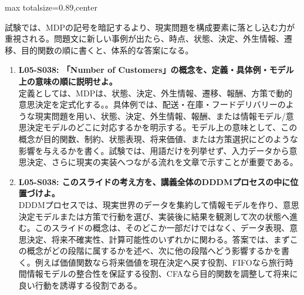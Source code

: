 \begin{minipage}[t]{0.58\textwidth}
\begin{adjustbox}{max totalsize={\textwidth}{0.89\textheight},center}
\begin{minipage}{\textwidth}
試験では、MDPの記号を暗記するより、現実問題を構成要素に落とし込む力が重視される。問題文に新しい事例が出たら、時点、状態、決定、外生情報、遷移、目的関数の順に書くと、体系的な答案になる。\par{}\begin{enumerate}\item \textbf{L05-S038: 「Number of Customers」の概念を、定義・具体例・モデル上の意味の順に説明せよ。}\\定義としては、MDPは、状態、決定、外生情報、遷移、報酬、方策で動的意思決定を定式化する。。具体例では、配送・在庫・フードデリバリーのような現実問題を用い、状態、決定、外生情報、報酬、または情報モデル/意思決定モデルのどこに対応するかを明示する。モデル上の意味として、この概念が目的関数、制約、状態表現、将来価値、または方策選択にどのような影響を与えるかを書く。試験では、用語だけを列挙せず、入力データから意思決定、さらに現実の実装へつながる流れを文章で示すことが重要である。\item \textbf{L05-S038: このスライドの考え方を、講義全体のDDDMプロセスの中に位置づけよ。}\\DDDMプロセスでは、現実世界のデータを集約して情報モデルを作り、意思決定モデルまたは方策で行動を選び、実装後に結果を観測して次の状態へ進む。このスライドの概念は、そのどこか一部だけではなく、データ表現、意思決定、将来不確実性、計算可能性のいずれかに関わる。答案では、まずこの概念がどの段階に属するかを述べ、次に他の段階へどう影響するかを書く。例えば価値関数なら将来価値を現在決定へ戻す役割、FIFOなら旅行時間情報モデルの整合性を保証する役割、CFAなら目的関数を調整して将来に良い行動を誘導する役割である。\end{enumerate}
\end{minipage}
\end{adjustbox}
\end{minipage}


